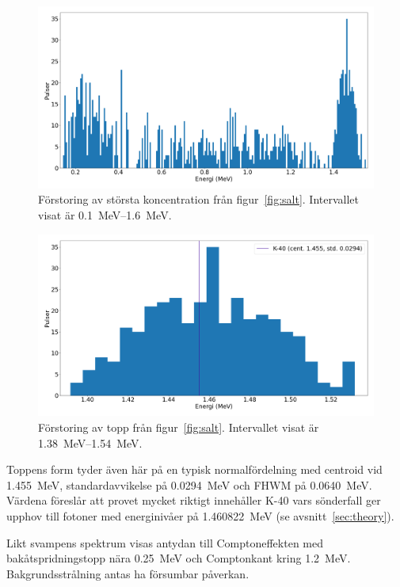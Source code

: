 \begin{figure}[!ht]
    \centering
    \includegraphics[width=\textwidth, keepaspectratio]{../images/salt_zoom.png}
    \caption{
        Förstoring av största koncentration från figur~\ref{fig:salt}.
        Intervallet visat är \qtyrange{0.1}{1.6}{\MeV}.
    }
    \label{fig:saltzoom}
\end{figure}

\begin{figure}[!ht]
    \centering
    \includegraphics[width=\textwidth, keepaspectratio]{../images/salt_top.png}
    \caption{
        Förstoring av topp från figur~\ref{fig:salt}.
        Intervallet visat är \qtyrange{1.38}{1.54}{\MeV}.
    }
    \label{fig:salttop}
\end{figure}

Toppens form tyder även här på en typisk normalfördelning med centroid vid
\qty{1.455}{\MeV}, standardavvikelse på \qty{0.0294}{\MeV} och FHWM på
\qty{0.0640}{\MeV}. Värdena föreslår att provet mycket riktigt innehåller K-40
vars sönderfall ger upphov till fotoner med energinivåer på
\qty{1.460822}{\MeV} (se avsnitt~\ref{sec:theory}).

Likt svampens spektrum visas antydan till Comptoneffekten med
bakåtspridningstopp nära \qty{0.25}{\MeV} och Comptonkant kring
\qty{1.2}{\MeV}. Bakgrundsstrålning antas ha försumbar påverkan.

